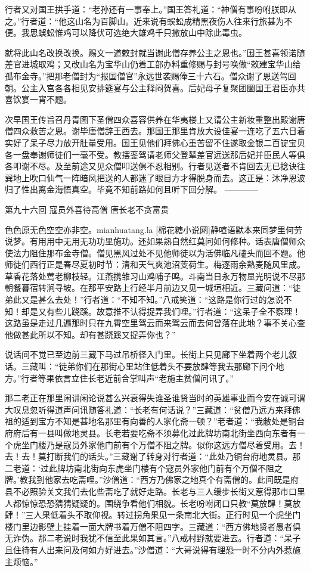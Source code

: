 \documentclass[12pt,UTF8]{ctexbook}
\begin{document}
{	行者又对国王拱手道：“老孙还有一事奉上。”国王答礼道：“神僧有事吩咐朕即从之。”行者道：“他这山名为百脚山。近来说有蜈蚣成精黑夜伤人往来行旅甚为不便。我思蜈蚣惟鸡可以降伏可选绝大雄鸡千只撒放山中除此毒虫。
	
	就将此山名改换改换。赐文一道敕封就当谢此僧存养公主之恩也。”国王甚喜领诺随差官进城取鸡；又改山名为宝华山仍着工部办料重修赐与封号唤做“敕建宝华山给孤布金寺。”把那老僧封为“报国僧官”永远世袭赐俸三十六石。僧众谢了恩送驾回朝。公主入宫各各相见安排筵宴与公主释闷贺喜。后妃母子复聚团圞国王君臣亦共喜饮宴一宵不题。
	
	次早国王传旨召丹青图下圣僧四众喜容供养在华夷楼上又请公主新妆重整出殿谢唐僧四众救苦之恩。谢毕唐僧辞王西去。那国王那里肯放大设佳宴一连吃了五六日着实好了呆子尽力放开肚量受用。国王见他们拜佛心重苦留不住遂取金银二百锭宝贝各一盘奉谢师徒们一毫不受。教摆銮驾请老师父登辇差官远送那后妃并臣民人等俱各叩谢不尽。及至前途又见众僧叩送俱不忍相别。行者见送者不肯回去无已捻诀往巽地上吹口仙气一阵暗风把送的人都迷了眼目方才得脱身而去。这正是：沐净恩波归了性出离金海悟真空。毕竟不知前路如何且听下回分解。
	------------
	
	第九十六回 寇员外喜待高僧 唐长老不贪富贵
	
	色色原无色空空亦非空。mianhuatang.la [棉花糖小说网]静喧语默本来同梦里何劳说梦。有用用中无用无功功里施功。还如果熟自然红莫问如何修种。话表唐僧师众使法力阻住那布金寺僧。僧见黑风过处不见他师徒以为活佛临凡磕头而回不题。他师徒们西行正是春尽夏初时节：清和天气爽池沼芰荷生。梅逐雨余熟麦随风里成。草香花落处莺老柳枝轻。江燕携雏习山鸡哺子鸣。斗南当日永万物显光明说不尽那朝餐暮宿转涧寻坡。在那平安路上行经半月前边又见一城垣相近。三藏问道：“徒弟此又是甚么去处！”行者道：“不知不知。”八戒笑道：“这路是你行过的怎说不知！却是又有些儿跷蹊。故意推不认得捉弄我们哩。”行者道：“这呆子全不察理！这路虽是走过几遍那时只在九霄空里驾云而来驾云而去何曾落在此地？事不关心查他做甚此所以不知。却有甚跷蹊又捉弄你也？”
	
	说话间不觉已至边前三藏下马过吊桥径入门里。长街上只见廊下坐着两个老儿叙话。三藏叫：“徒弟你们在那街心里站住低着头不要放肆等我去那廊下问个地方。”行者等果依言立住长老近前合掌叫声“老施主贫僧问讯了。”
	
	那二老正在那里闲讲闲论说甚么兴衰得失谁圣谁贤当时的英雄事业而今安在诚可谓大叹息忽听得道声问讯随答礼道：“长老有何话说？”三藏道：“贫僧乃远方来拜佛祖的适到宝方不知是甚地名那里有向善的人家化斋一顿？”老者道：“我敝处是铜台府府后有一县叫做地灵县。长老若要吃斋不须募化过此牌坊南北街坐西向东者有一个虎坐门楼乃是寇员外家他门前有个万僧不阻之牌。似你这远方僧尽着受用。去！去！去！莫打断我们的话头。”三藏谢了转身对行者道：“此处乃铜台府地灵县。那二老道：‘过此牌坊南北街向东虎坐门楼有个寇员外家他门前有个万僧不阻之牌。’教我到他家去吃斋哩。”沙僧道：“西方乃佛家之地真个有斋僧的。此间既是府县不必照验关文我们去化些斋吃了就好走路。长老与三人缓步长街又惹得那市口里人都惊惊恐恐猜猜疑疑的。围绕争看他们相貌。长老吩咐闭口只教“莫放肆！莫放肆！”三人果低着头不取仰视。转过拐角果见一条南北大街。正行时见一个虎坐门楼门里边影壁上挂着一面大牌书着万僧不阻四字。三藏道：“西方佛地贤者愚者俱无诈伪。那二老说时我犹不信至此果如其言。”八戒村野就要进去。行者道：“呆子且住待有人出来问及何如方好进去。”沙僧道：“大哥说得有理恐一时不分内外惹施主烦恼。”
	
}
\end{document}
